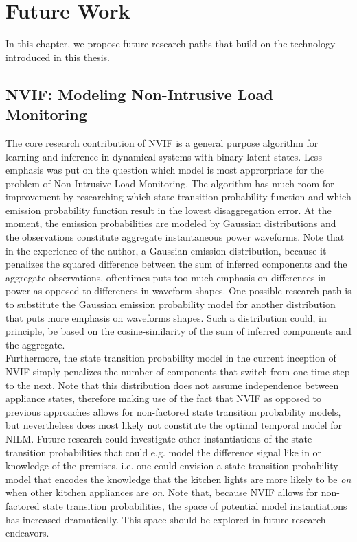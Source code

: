 \documentclass[11pt]{cmuthesis} %
\begin{document}
\chapter{Future Work}
\label{chapter:future_work}
In this chapter, we propose future research paths that build on the technology introduced in this thesis.

\section{NVIF: Modeling Non-Intrusive Load Monitoring}

The core research contribution of NVIF is a general purpose algorithm for learning and inference in dynamical systems with binary latent states. Less emphasis was put on the question which model is most approrpriate for the problem of Non-Intrusive Load Monitoring. The algorithm has much room for improvement by researching which state transition probability function and which emission probability function result in the lowest disaggregation error. At the moment, the emission probabilities are modeled by Gaussian distributions and the observations constitute aggregate instantaneous power waveforms. Note that in the experience of the author, a Gaussian emission distribution, because it penalizes the squared difference between the sum of inferred components and the aggregate observations, oftentimes puts too much emphasis on differences in power as opposed to differences in waveform shapes. One possible research path is to substitute the Gaussian emission probability model for another distribution that puts more emphasis on waveforms shapes. Such a distribution could, in principle, be based on the cosine-similarity of the sum of inferred components and the aggregate.\\
Furthermore, the state transition probability model in the current inception of NVIF simply penalizes the number of components that switch from one time step to the next. Note that this distribution does not assume independence between appliance states, therefore making use of the fact that NVIF as opposed to previous approaches allows for non-factored state transition probability models, but nevertheless does most likely not constitute the optimal temporal model for NILM. Future research could investigate other instantiations of the state transition probabilities that could e.g. model the difference signal like in \cite{kolter2012approximate,lange2016varbolt} or knowledge of the premises, i.e. one could envision a state transition probability model that encodes the knowledge that the kitchen lights are more likely to be \emph{on} when other kitchen appliances are \emph{on}. Note that, because NVIF allows for non-factored state transition probabilities, the space of potential model instantiations has increased dramatically. This space should be explored in future research endeavors.
\end{document}
